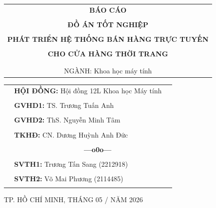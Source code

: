 \documentclass[a4paper]{article}
\theoremstyle{definition}
\begin{document}
\begin{titlepage}
  \begin{center}
    \begin{tabular}{c}
      \multicolumn{1}{c}{\textbf{{\LARGE BÁO CÁO}}} \\
      \\{\textbf{{\LARGE ĐỒ ÁN TỐT NGHIỆP}}}
      \\
      \\
      \textbf{\LARGE PHÁT TRIỂN HỆ THỐNG BÁN HÀNG TRỰC TUYẾN}
      \\
      \\
      \textbf{\LARGE CHO CỬA HÀNG THỜI TRANG}
      \\
      \\
      \\ \vspace{0.5cm} {\Large NGÀNH: Khoa học máy tính}
    \end{tabular}
  \end{center}
  \vspace{0.5cm}
  \begin{table}[h]
    \begin{tabular}{rll}
      \hspace{6 cm} & \textbf{\Large HỘI ĐỒNG:} {\Large Hội đồng 12L Khoa học Máy tính}
      \\
      \\
      \hspace{6 cm} & \textbf{\Large GVHD1:} {\Large TS. Trương Tuấn Anh}
      \\
      \\
      \hspace{6 cm} & \textbf{\Large GVHD2:}  {\Large ThS. Nguyễn Minh Tâm}
      \\
      \\
      \hspace{6 cm} & \textbf{\Large TKHĐ:} {\Large CN. Dương Huỳnh Anh Đức}
      \\
      \\
      \hspace{6 cm} & \textbf{$\;$ $\;$$\;$$\;$$\;$$\;$$\;$$\;$$\;$$\;$$\;$$\;$$\;$$\;$$\;$$\;$$\;$$\;$$\;$$\;$$\;$$\;$$\;$$\;$$\;$$\;$$\;$$\;$$\;$$\;$$\;$$\;$$\;$$\;$ \Large ---o0o---}
      \\
      \\
      \hspace{6 cm} & \textbf{\Large SVTH1:} {\Large Trương Tấn Sang (2212918)}
      \\
      \\
      \hspace{6 cm} & \textbf{\Large SVTH2:}  {\Large Võ Mai Phương (2114485)}
      \\
      \\
    \end{tabular}
  \end{table}
  \vspace{0.5cm}
  \begin{center}
    {\Large TP. HỒ CHÍ MINH, THÁNG 05 / NĂM 2026 }
  \end{center}
\end{titlepage}
\end{document}
